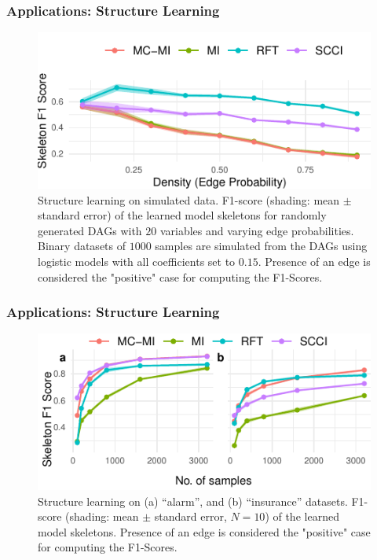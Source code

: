 \documentclass{beamer}
\begin{document}
\begin{frame}
	\frametitle{Applications: Structure Learning}
	\begin{figure}
		\centering
		\includegraphics{imgs/sl_density.pdf}
		\caption{Structure learning on simulated data. F1-score
		(shading: mean $\pm$ standard error) of the learned model
		skeletons for randomly generated DAGs with $20$ variables and
		varying edge probabilities.  Binary datasets of $ 1000 $
		samples are simulated from the DAGs using logistic models with
		all coefficients set to $ 0.15$. Presence of an edge is
		considered the "positive" case for computing the F1-Scores.}
	\end{figure}
\end{frame}

\begin{frame}
	\frametitle{Applications: Structure Learning}
	\begin{figure}
		\centering
		\includegraphics{imgs/sl.pdf}
		\caption{Structure learning on (a) ``alarm'', and (b)
		``insurance'' datasets.  F1-score (shading: mean $\pm$ standard
		error, $N=10$) of the learned model skeletons.  Presence of an
		edge is considered the "positive" case for computing the
		F1-Scores.}
	\end{figure}
\end{frame}
\end{document}
